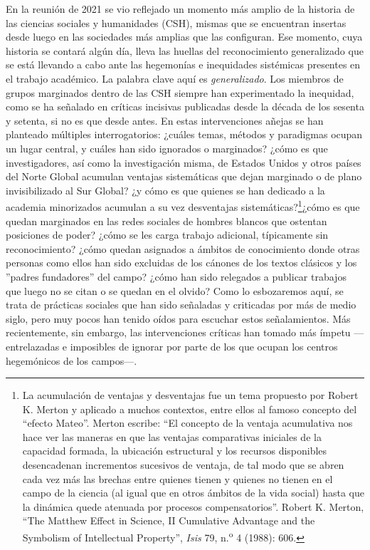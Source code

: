 \documentclass{tufte-handout}
\begin{document}
En la reunión de 2021 se vio reflejado un momento más amplio de la
historia de las ciencias sociales y humanidades (CSH), mismas que se
encuentran insertas desde luego en las sociedades más amplias que las
configuran. Ese momento, cuya historia se contará algún día, lleva las
huellas del reconocimiento generalizado que se está llevando a cabo ante
las hegemonías e inequidades sistémicas presentes en el trabajo
académico. La palabra clave aquí es \emph{generalizado}. Los miembros de
grupos marginados dentro de las CSH siempre han experimentado la
inequidad, como se ha señalado en críticas incisivas publicadas desde la
década de los sesenta y setenta, si no es que desde antes. En estas
intervenciones añejas se han planteado múltiples interrogatorios:
¿cuáles temas, métodos y paradigmas ocupan un lugar central, y cuáles
han sido ignorados o marginados? ¿cómo es que investigadores, así como
la investigación misma, de Estados Unidos y otros países del Norte
Global acumulan ventajas sistemáticas que dejan marginado o de plano
invisibilizado al Sur Global? ¿y cómo es que quienes se han dedicado a
la academia minorizados acumulan a su vez desventajas
sistemáticas?\footnote{La acumulación de ventajas y desventajas fue un
  tema propuesto por Robert K. Merton y aplicado a muchos contextos,
  entre ellos al famoso concepto del ``efecto Mateo''. Merton escribe:
  ``El concepto de la ventaja acumulativa nos hace ver las maneras en
  que las ventajas comparativas iniciales de la capacidad formada, la
  ubicación estructural y los recursos disponibles desencadenan
  incrementos sucesivos de ventaja, de tal modo que se abren cada vez
  más las brechas entre quienes tienen y quienes no tienen en el campo
  de la ciencia (al igual que en otros ámbitos de la vida social) hasta
  que la dinámica quede atenuada por procesos compensatorios''. Robert
  K. Merton, ``The Matthew Effect in Science, II Cumulative Advantage
  and the Symbolism of Intellectual Property'', \emph{Isis} 79,
  n.\textsuperscript{o} 4 (1988): 606.}¿cómo es que quedan marginados en
las redes sociales de hombres blancos que ostentan posiciones de poder?
¿cómo se les carga trabajo adicional, típicamente sin reconocimiento?
¿cómo quedan asignados a ámbitos de conocimiento donde otras personas
como ellos han sido excluidas de los cánones de los textos clásicos y
los ''padres fundadores'' del campo? ¿cómo han sido relegados a publicar
trabajos que luego no se citan o se quedan en el olvido? Como lo
esbozaremos aquí, se trata de prácticas sociales que han sido señaladas
y criticadas por más de medio siglo, pero muy pocos han tenido oídos
para escuchar estos señalamientos. Más recientemente, sin embargo, las
intervenciones críticas han tomado más ímpetu ---entrelazadas e
imposibles de ignorar por parte de los que ocupan los centros
hegemónicos de los campos---.
\end{document}
